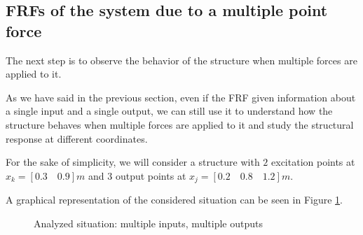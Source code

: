 \subsection{FRFs of the system due to a multiple point force}
\label{subsec:FRFs_of_the_system_due_to_multiple_point_force}

The next step is to observe the behavior of the structure when multiple forces are applied to it.

As we have said in the previous section, even if the FRF given information about a single input and a single output, we can still use it to understand how the structure behaves when multiple forces are applied to it and study the structural response at different coordinates.

For the sake of simplicity, we will consider a structure with $2$ excitation points at $x_k = [0.3 \quad 0.9]m$ and $3$ output points at $x_j = [0.2 \quad 0.8 \quad 1.2]m$.

A graphical representation of the considered situation can be seen in Figure \ref{fig:beam_multi_point_force}.

\begin{figure}[H]
    \centering
    \caption{Analyzed situation: multiple inputs, multiple outputs}
    \label{fig:beam_multi_point_force}
\end{figure}

